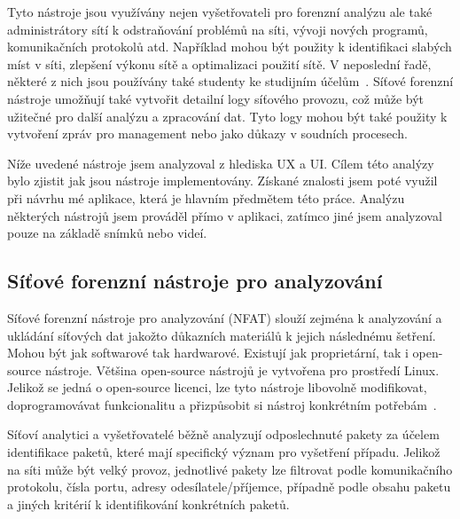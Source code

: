     Tyto nástroje jsou využívány nejen vyšetřovateli pro forenzní analýzu ale také administrátory sítí k odstraňování problémů na síti, vývoji nových programů, komunikačních protokolů atd. Například mohou být použity k identifikaci slabých míst v síti, zlepšení výkonu sítě a optimalizaci použití sítě. V neposlední řadě, některé z nich jsou používány také studenty ke studijním  účelům~\cite{EnisaReference}. Síťové forenzní nástroje umožňují také vytvořit detailní logy síťového provozu, což může být užitečné pro další analýzu a zpracování dat. Tyto logy mohou být také použity k vytvoření zpráv pro management nebo jako důkazy v soudních procesech. 

    Níže uvedené nástroje jsem analyzoval z hlediska UX a UI. Cílem této analýzy bylo zjistit jak jsou nástroje implementovány. Získané znalosti jsem poté využil při návrhu mé aplikace, která je hlavním předmětem této práce. Analýzu některých nástrojů jsem prováděl přímo v aplikaci, zatímco jiné jsem analyzoval pouze na základě snímků nebo videí.    

    \subsection{Síťové forenzní nástroje pro analyzování}
    \label{forensicTools}
        Síťové forenzní nástroje pro analyzování (\gls{NFAT}) slouží zejména k analyzování a ukládání síťových dat jakožto důkazních materiálů k jejich následnému šetření. Mohou být jak softwarové tak hardwarové. Existují jak proprietární, tak i open-source nástroje. Většina open-source nástrojů je vytvořena pro prostředí Linux. Jelikož se jedná o open-source licenci, lze tyto nástroje libovolně modifikovat, doprogramovávat funkcionalitu a přizpůsobit si nástroj konkrétním potřebám~\cite{FundamentalsOfNetworkForensicsReference}.
        
        Síťoví analytici a vyšetřovatelé běžně analyzují odposlechnuté pakety za účelem identifikace paketů, které mají specifický význam pro vyšetření případu. Jelikož na síti může být velký provoz, jednotlivé pakety lze filtrovat podle komunikačního protokolu, čísla portu, adresy odesílatele/příjemce, případně podle obsahu paketu a jiných kritérií k identifikování konkrétních paketů.
    
